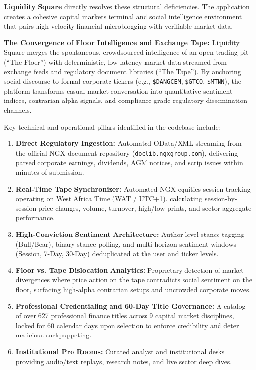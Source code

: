 \documentclass[11pt,a4paper]{article}
\begin{document}
\textbf{Liquidity Square} directly resolves these structural deficiencies. The application creates a cohesive capital markets terminal and social intelligence environment that pairs high-velocity financial microblogging with verifiable market data.

\begin{tcolorbox}[title=Core Mission and Paradigm]
\textbf{The Convergence of Floor Intelligence and Exchange Tape:}
Liquidity Square merges the spontaneous, crowdsourced intelligence of an open trading pit (``The Floor'') with deterministic, low-latency market data streamed from exchange feeds and regulatory document libraries (``The Tape''). By anchoring social discourse to formal corporate tickers (e.g., \texttt{\$DANGCEM}, \texttt{\$GTCO}, \texttt{\$MTNN}), the platform transforms casual market conversation into quantitative sentiment indices, contrarian alpha signals, and compliance-grade regulatory dissemination channels.
\end{tcolorbox}

Key technical and operational pillars identified in the codebase include:
\begin{enumerate}
    \item \textbf{Direct Regulatory Ingestion:} Automated OData/XML streaming from the official NGX document repository (\texttt{doclib.ngxgroup.com}), delivering parsed corporate earnings, dividends, AGM notices, and scrip issues within minutes of submission.
    \item \textbf{Real-Time Tape Synchronizer:} Automated NGX equities session tracking operating on West Africa Time (WAT / UTC+1), calculating session-by-session price changes, volume, turnover, high/low prints, and sector aggregate performance.
    \item \textbf{High-Conviction Sentiment Architecture:} Author-level stance tagging (Bull/Bear), binary stance polling, and multi-horizon sentiment windows (Session, 7-Day, 30-Day) deduplicated at the user and ticker levels.
    \item \textbf{Floor vs. Tape Dislocation Analytics:} Proprietary detection of market divergences where price action on the tape contradicts social sentiment on the floor, surfacing high-alpha contrarian setups and uncrowded corporate moves.
    \item \textbf{Professional Credentialing and 60-Day Title Governance:} A catalog of over 627 professional finance titles across 9 capital market disciplines, locked for 60 calendar days upon selection to enforce credibility and deter malicious sockpuppeting.
    \item \textbf{Institutional Pro Rooms:} Curated analyst and institutional desks providing audio/text replays, research notes, and live sector deep dives.
\end{enumerate}
\end{document}
